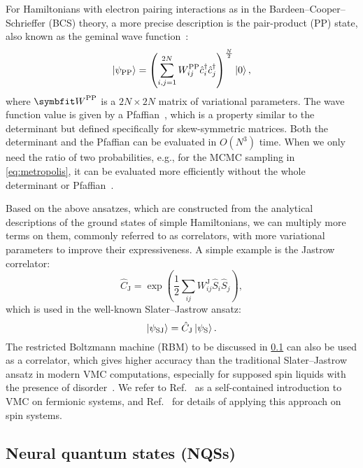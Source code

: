 For Hamiltonians with electron pairing interactions as in the Bardeen--Cooper--Schrieffer (BCS) theory, a more precise description is the pair-product (PP) state, also known as the geminal wave function~\cite{bouchaud1988pair, gros1988superconductivity, tahara2008variational, astrakhantsev2021broken}:
\begin{equation}
\ket{\psi_\text{PP}} = \left( \sum_{i, j = 1}^{2 N} W^\text{PP}_{i j} \hat{c}^\dagger_i \hat{c}^\dagger_j \right)^{\frac{N}{2}} \ket{0},
\end{equation}
where $\mW^\text{PP}$ is a $2 N \times 2 N$ matrix of variational parameters. The wave function value is given by a Pfaffian~\cite{cayley1849determinants}, which is a property similar to the determinant but defined specifically for skew-symmetric matrices. Both the determinant and the Pfaffian can be evaluated in $O(N^3)$ time. When we only need the ratio of two probabilities, e.g., for the MCMC sampling in \cref{eq:metropolis}, it can be evaluated more efficiently without the whole determinant or Pfaffian~\cite{becca2017quantum5}.

Based on the above ansatzes, which are constructed from the analytical descriptions of the ground states of simple Hamiltonians, we can multiply more terms on them, commonly referred to as correlators, with more variational parameters to improve their expressiveness. A simple example is the Jastrow correlator:
\begin{equation}
\hat{C}_\text{J} = \exp\left( {\frac{1}{2} \sum_{i j} W^\text{J}_{i j} \hat{S}_i \hat{S}_j} \right),
\end{equation}
which is used in the well-known Slater--Jastrow ansatz:
\begin{equation}
\ket{\psi_\text{SJ}} = \hat{C}_\text{J} \ket{\psi_\text{S}}.
\end{equation}
The restricted Boltzmann machine (RBM) to be discussed in \cref{sec:nqs} can also be used as a correlator, which gives higher accuracy than the traditional Slater--Jastrow ansatz in modern VMC computations, especially for supposed spin liquids with the presence of disorder~\cite{nomura2017restricted, ferrari2019neural, nomura2021dirac}. We refer to Ref.~\cite{becca2017quantum5} as a self-contained introduction to VMC on fermionic systems, and Ref.~\cite{ferrari2019static} for details of applying this approach on spin systems.

\subsection{Neural quantum states (NQSs)}
\label{sec:nqs}

